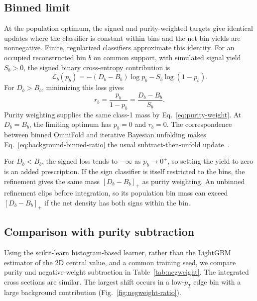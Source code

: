 \subsection{Binned limit}
\label{sec:negweight-binned}

At the population optimum, the signed and purity-weighted targets give identical updates where the classifier is constant within bins and the net bin yields are nonnegative. Finite, regularized classifiers approximate this identity. For an occupied reconstructed bin $b$ on common support, with simulated signal yield $S_b>0$, the signed binary cross-entropy contribution is
\begin{equation}
  \mathcal L_b(p_b)=-(D_b-B_b)\log p_b-S_b\log(1-p_b).
  \label{eq:background-binned-loss}
\end{equation}
For $D_b>B_b$, minimizing this loss gives \begingroup {}
\label{eq:background-binned-ratio}
\label{eq:negweight-rb}
\begin{equation*}
  r_b=\frac{p_b}{1-p_b}=\frac{D_b-B_b}{S_b}.
  \tag{\theequation}
\end{equation*}
\endgroup Purity weighting supplies the same class-1 mass by Eq.~\eqref{eq:purity-weight}. At $D_b=B_b$, the limiting optimum has $p_b=0$ and $r_b=0$. The correspondence between binned OmniFold and iterative Bayesian unfolding makes Eq.~\eqref{eq:background-binned-ratio} the usual subtract-then-unfold update~\cite{Andreassen:2019cjw,Andreassen:2021zzk,DAgostini:1994fjx}.

For $D_b<B_b$, the signed loss tends to $-\infty$ as $p_b\to0^+$, so setting the yield to zero is an added prescription. If the sign classifier is itself restricted to the bins, the refinement gives the same mass $[D_b-B_b]_+$ as purity weighting. An unbinned refinement clips before integration, so its population bin mass can exceed $[D_b-B_b]_+$ if the net density has both signs within the bin.

\subsection{Comparison with purity subtraction}
\label{sec:negweight-2d}
\label{sec:negweight-uq}
\label{sec:negweight-footing}

Using the scikit-learn histogram-based learner, rather than the LightGBM estimator of the 2D central value, and a common training seed, we compare purity and negative-weight subtraction in Table~\ref{tab:negweight}. The integrated cross sections are similar. The largest shift occurs in a low-$p_T$ edge bin with a large background contribution (Fig.~\ref{fig:negweight-ratio}).

